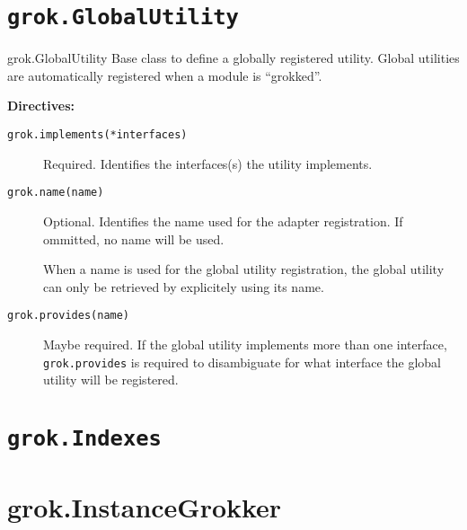 \documentclass[10pt,a4paper,english]{manual}
\begin{document}
\section{\texttt{grok.GlobalUtility}}
\begin{classdesc*}{grok.GlobalUtility}
Base class to define a globally registered utility. Global utilities are
automatically registered when a module is ``grokked''.

\textbf{Directives:}
\begin{description}
\item[{\texttt{grok.implements(*interfaces)}}] %

Required. Identifies the interfaces(s) the utility implements.

\item[{\texttt{grok.name(name)}}] %

Optional. Identifies the name used for the adapter registration. If ommitted, no
name will be used.

When a name is used for the global utility registration, the global utility can
only be retrieved by explicitely using its name.

\item[{\texttt{grok.provides(name)}}] %

Maybe required. If the global utility implements more than one interface,
\texttt{grok.provides} is required to disambiguate for what interface the global
utility will be registered.

\end{description}
\end{classdesc*}



\section{\texttt{grok.Indexes}}



\section{grok.InstanceGrokker}
\end{document}
